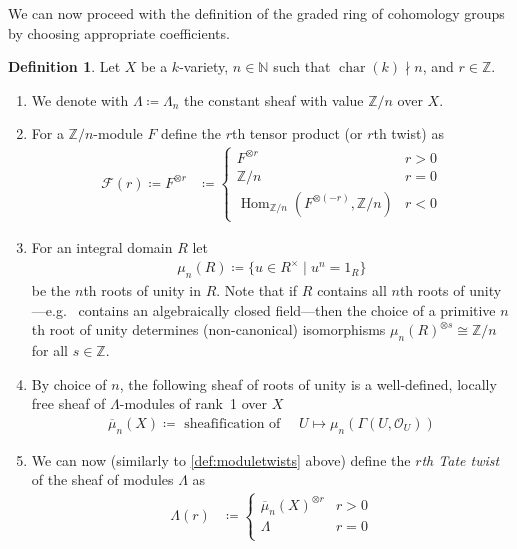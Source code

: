 \documentclass[english,headsepline=0.25pt]{scrartcl}
\theoremstyle{definition}
\newtheorem{Def}{Definition}[section]
\theoremstyle{remark}
\newcommand*{\N}{\mathds{N}}
\newcommand*{\Z}{\mathds{Z}}
\newcommand*{\Zmod}[1]{\Z/#1} %
\newcommand*{\F}{\mathcal{F}} %
\DeclareMathOperator{\Char}{char} %
\DeclareMathOperator{\Hom}{Hom} %
\newcommand*{\forexample}{e.g.\ }
\begin{document}
We can now proceed with the definition of the graded ring of
cohomology groups by choosing appropriate coefficients.
\begin{Def}\label{def:coefficients}
  Let $X$ be a $k$-variety,
  $n\in\N$ such that $\Char(k)\nmid n$,
  and $r\in\Z$.
  \begin{enumerate}
  \item We denote with $\Lambda\coloneqq\Lambda_n$ the constant sheaf
    with value $\Zmod{n}$ over $X$.
  \item\label{def:moduletwists}
    For a $\Zmod{n}$-module $F$ define the $r$th tensor product
    (or $r$th twist) as
    \begin{align*}
      \F(r)\coloneqq F^{\otimes r}
      &\coloneqq \begin{cases}
        F^{\otimes r} &r>0\\
        \Zmod{n} &r=0\\
        \Hom_{\Zmod{n}}(F^{\otimes (-r)},\Zmod{n}) &r<0
      \end{cases}
    \end{align*}
  \item\label{def:rootsofunity} For an integral domain $R$ let
    \begin{gather*}
      \mu_n(R)\coloneqq\{ u\in R^\times\;|\;u^n=1_R\}
    \end{gather*}
    be the $n$th roots of unity in $R$. 
    Note that if $R$ contains all $n$th roots of unity---\forexample
    contains an algebraically closed field---then the choice of a
    primitive $n$th root of unity determines (non-canonical) isomorphisms
    $\mu_n(R)^{\otimes s}\cong\Zmod{n}$ for all $s\in\Z$.
  \item By choice of $n$, the following sheaf of roots of unity is a
    well-defined, locally free sheaf of $\Lambda$-modules of rank~1
    over $X$
    \begin{gather*}
      \overline\mu_n(X) \coloneqq \text{ sheafification of }\quad
      U\mapsto \mu_n(\Gamma(U,\mathcal O_U))
    \end{gather*}
  \item\label{def:tatetwist}
    We can now (similarly to \ref{def:moduletwists} above) define the
    \emph{$r$th Tate twist} of the sheaf of modules $\Lambda$ as
    \begin{align*}
      \Lambda(r) &\coloneqq \begin{cases}
        \overline\mu_n(X)^{\otimes r} &r>0\\
        \Lambda &r=0\\

\end{cases}
\end{align*}
\end{enumerate}
\end{Def}
\end{document}
